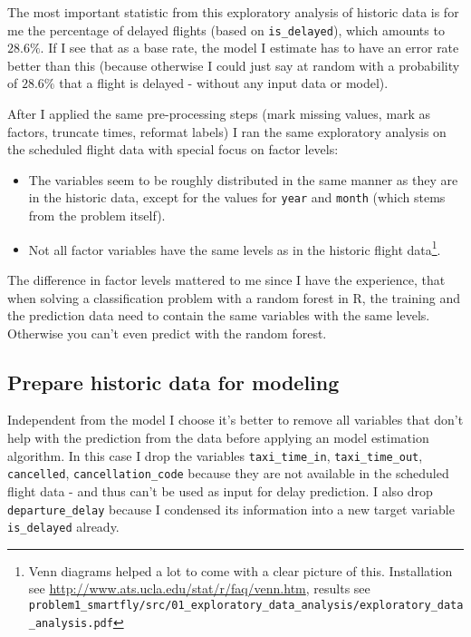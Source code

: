 \documentclass{article}\usepackage[]{graphicx}\usepackage[]{color}
\begin{document}
The most important statistic from this exploratory analysis of historic data is for me the percentage of delayed flights (based on \verb+is_delayed+), which amounts to $28.6\%$. If I see that as a base rate, the model I estimate has to have an error rate better than this (because otherwise I could just say at random with a probability of $28.6\%$ that a flight is delayed - without any input data or model).

After I applied the same pre-processing steps (mark missing values, mark as factors, truncate times, reformat labels) I ran the same exploratory analysis on the scheduled flight data with special focus on factor levels:
\begin{itemize}
	\item The variables seem to be roughly distributed in the same manner as they are in the historic data, except for the values for \verb+year+ and \verb+month+ (which stems from the problem itself).
	\item Not all factor variables have the same levels as in the historic flight data\footnote{Venn diagrams helped a lot to come with a clear picture of this. Installation see \url{http://www.ats.ucla.edu/stat/r/faq/venn.htm}, results see \verb+problem1_smartfly/src/01_exploratory_data_analysis/exploratory_data_analysis.pdf+}.
\end{itemize}

The difference in factor levels mattered to me since I have the experience, that when solving a classification problem with a random forest in R, the training and the prediction data need to contain the same variables with the same levels. Otherwise you can't even predict with the random forest.


\subsection{Prepare historic data for modeling} %
\label{sub:prepare_historic_data_for_modeling}
Independent from the model I choose it's better to remove all variables that don't help with the prediction from the data before applying an model estimation algorithm. In this case I drop the variables \verb+taxi_time_in+, \verb+taxi_time_out+, \verb+cancelled+, \verb+cancellation_code+ because they are not available in the scheduled flight data - and thus can't be used as input for delay prediction. I also drop \verb+departure_delay+ because I condensed its information into a new target variable \verb+is_delayed+ already.
\end{document}
